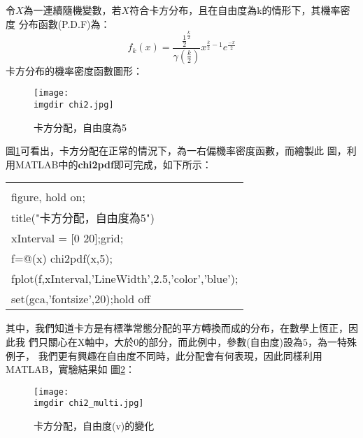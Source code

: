 \begin{enumerate}
{					令$X$為一連續隨機變數，若$X$符合卡方分布，且在自由度為k的情形下，其機率密度						分布函數(P.D.F)為：
					$$f_k(x)=\frac{\frac{1}{2}^{\frac{k}{2}}}{\gamma (\frac{k}{2})} 						x^{\frac{k}{2}-1} e^{\frac{-x}{2}} $$
					卡方分布的機率密度函數圖形：
					\begin{figure}[H]	
		 		 		\centering	 			 	 
   				 		\texttt{[image: \\imgdir chi2.jpg]} 
   			 			\caption{卡方分配，自由度為5}   		
   			 			\label{chi2}   			 		 
					\end{figure}					
					圖\ref{chi2}可看出，卡方分配在正常的情況下，為一右偏機率密度函數，而繪製此						圖，利用MATLAB中的\textbf{chi2pdf}即可完成，如下所示：
					\begin{center}\colorbox{slight}{
						\begin{tabular}{p{}}
							\MJHmarker{\textbf{\color{darkblue}{MATLAB語法 :}}}\\		
							figure, hold on;    \\
    						title("卡方分配，自由度為5")\\
   							xInterval = [0 20];grid;\\   
   							f=@(x) chi2pdf(x,5);\\         
    						fplot(f,xInterval,'LineWidth',2.5,'color','blue'); \\
   							set(gca,'fontsize',20);hold off\\ 
						\end{tabular}
					}
					\end{center}
					\bigskip
					其中，我們知道卡方是有標準常態分配的平方轉換而成的分布，在數學上恆正，因此我						們只關心在X軸中，大於0的部分，而此例中，參數(自由度)設為$5$，為一特殊例子，						我們更有興趣在自由度不同時，此分配會有何表現，因此同樣利用MATLAB，實驗結果如						圖\ref{chi2_multi}：
					\begin{figure}[H]	
		 		 		\centering	 			 	 
   				 		\texttt{[image: \\imgdir chi2\_multi.jpg]} 
   			 			\caption{卡方分配，自由度(v)的變化}   		
   			 			\label{chi2_multi}   			 		 
					\end{figure}
					
}
\end{enumerate}
